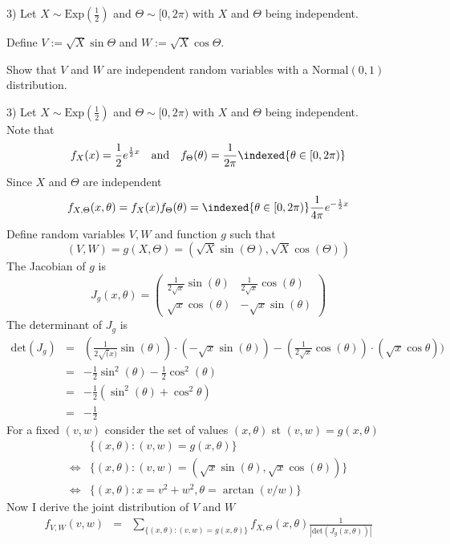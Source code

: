 \documentclass[11pt,a4paper]{article}
\begin{document}
\begin{question}{3)}
  Let $X\sim\text{Exp}\left(\frac12\right)$ and $\Theta\sim[0,2\pi)$ with $X$ and $\Theta$ being independent.
  \par Define $V:=\sqrt{X}\sin\Theta$ and $W:=\sqrt{X}\cos\Theta$.
  \par Show that $V$ and $W$ are independent random variables with a $\text{Normal}(0,1)$ distribution.
\end{question}

\begin{answer}{3)}
  Let $X\sim\text{Exp}\left(\frac12\right)$ and $\Theta\sim[0,2\pi)$ with $X$ and $\Theta$ being independent.\\
  Note that
  \[ f_X(x)=\frac12e^{\frac12x}\quad\text{and}\quad f_\Theta(\theta)=\frac1{2\pi}\indexed\{\theta\in[0,2\pi)\} \]
  Since $X$ and $\Theta$ are independent
  \[ f_{X,\Theta}(x,\theta)=f_X(x)f_\Theta(\theta)=\indexed\{\theta\in[0,2\pi)\}\frac1{4\pi}e^{-\frac12x} \]
  Define random variables $V,W$ and function $g$ such that
  \[ (V,W)=g(X,\Theta)=\left(\sqrt{X}\sin(\Theta),\sqrt{X}\cos(\Theta)\right) \]
  The Jacobian of $g$ is
  \[ J_g(x,\theta)=\begin{pmatrix}
    \frac1{2\sqrt{x}}\sin(\theta)&\frac1{2\sqrt{x}}\cos(\theta)\\
    \sqrt{x}\cos(\theta)&-\sqrt{x}\sin(\theta)
  \end{pmatrix} \]
  The determinant of $J_g$ is
  \[\begin{array}{rcl}
  \text{det}(J_g)&=&(\frac1{2\sqrt(x)}\sin(\theta))\cdot(-\sqrt{x}\sin(\theta))-(\frac1{2\sqrt{x}}\cos(\theta))\cdot(\sqrt{x}\cos\theta))\\
  &=&-\frac12\sin^2(\theta)-\frac12\cos^2(\theta)\\
  &=&-\frac12(\sin^2(\theta)+\cos^2\theta)\\
  &=&-\frac12
  \end{array}\]
  For a fixed $(v,w)$ consider the set of values $(x,\theta)$ st $(v,w)=g(x,\theta)$
  \[\begin{array}{rl}
    &\{(x,\theta):(v,w)=g(x,\theta)\}\\
    \Leftrightarrow&\{(x,\theta):(v,w)=(\sqrt{x}\sin(\theta),\sqrt{x}\cos(\theta))\}\\
    \Leftrightarrow&\{(x,\theta):x=v^2+w^2,\theta=\arctan(v/w)\}
  \end{array}\]
  Now I derive the joint distribution of $V$ and $W$
  \[\begin{array}{rcl}
      f_{V,W}(v,w)&=&\sum_{\{(x,\theta):(v,w)=g(x,\theta)\}}f_{X,\Theta}(x,\theta)\frac1{|\text{det}(J_g(x,\theta))|}\\

\end{array}\]
\end{answer}
\end{document}
